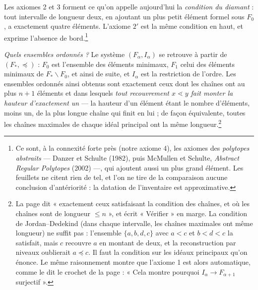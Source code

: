 \documentclass[11pt,a4paper]{article}
\begin{document}
Les axiomes 2 et 3 forment ce qu'on appelle aujourd'hui la \emph{condition du
diamant} : tout intervalle de longueur deux, en ajoutant un plus petit élément
formel sous $F_0$, a exactement quatre éléments. L'axiome $2'$ est la même
condition en haut, et exprime l'absence de bord.\footnote{Ce sont, à la
connexité forte près (notre axiome 4), les axiomes des \emph{polytopes
abstraits} --- Danzer et Schulte (1982), puis McMullen et Schulte,
\emph{Abstract Regular Polytopes} (2002) ---, qui ajoutent aussi un plus
grand élément. Les feuillets ne citent rien de tel, et l'on ne tire de la
comparaison aucune conclusion d'antériorité : la datation de l'inventaire est
approximative.}

\emph{Quels ensembles ordonnés ?} Le système $(F_\alpha, I_\alpha)$ se
retrouve à partir de $(F_*, \preceq)$ : $F_0$ est l'ensemble des éléments
minimaux, $F_1$ celui des éléments minimaux de $F_* \smallsetminus F_0$, et
ainsi de suite, et $I_\alpha$ est la restriction de l'ordre. Les ensembles
ordonnés ainsi obtenus sont exactement ceux dont les chaînes ont au plus
$n+1$ éléments et dans lesquels \emph{tout recouvrement $x \lessdot y$ fait
monter la hauteur d'exactement un} --- la hauteur d'un élément étant le
nombre d'éléments, moins un, de la plus longue chaîne qui finit en lui ; de
façon équivalente, toutes les chaînes maximales de chaque idéal principal
ont la même longueur.\footnote{La page dit « exactement ceux satisfaisant la
condition des chaînes, et où les chaînes sont de longueur $\leqslant n$ », et
écrit « Vérifier » en marge. La condition de Jordan--Dedekind (dans chaque
intervalle, les chaînes maximales ont même longueur) ne suffit pas :
l'ensemble $\{a, b, d, c\}$ avec $a < c$ et $b < d < c$ la satisfait, mais
$c$ recouvre $a$ en montant de deux, et la reconstruction par niveaux
oublierait $a \preceq c$. Il faut la condition sur les idéaux principaux
qu'on énonce. Le même raisonnement montre que l'axiome 1 est alors
automatique, comme le dit le crochet de la page : « Cela montre pourquoi
$I_\alpha \to F_{\alpha+1}$ surjectif ».}
\end{document}
